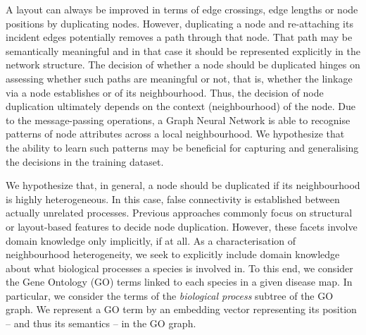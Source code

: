 \documentclass[
	fontsize=10pt, %
	twoside=true, %
	secnumdepth=1, %
  toc=indentunnumbered %
]{kaobook}
\begin{document}
A layout can always be improved in terms of edge crossings, edge lengths or node
positions by duplicating nodes. However, duplicating a node and re-attaching its
incident edges potentially removes a path through that node. That path
may be semantically meaningful and in that case it should be represented
explicitly in the network structure.
The decision of whether a node should be duplicated hinges on
assessing whether such paths are meaningful or not, that is, whether the linkage via
a node establishes  or  of its neighbourhood.
Thus, the decision of node duplication ultimately depends on the context
(neighbourhood) of the node.
%
Due to the message-passing operations, a Graph Neural
Network is able to recognise patterns of node attributes across a local
neighbourhood. We hypothesize that the ability to learn such patterns may be
beneficial for capturing and generalising the decisions in the training dataset.



We hypothesize that, in general, a node should be duplicated if its
neighbourhood is highly heterogeneous. In this case, false connectivity is
established between actually unrelated processes.
Previous approaches commonly focus on structural or layout-based features to
decide node duplication.
However, these facets involve domain knowledge only implicitly, if at all.
As a characterisation of neighbourhood heterogeneity, we seek
to explicitly include domain knowledge about what biological processes a species
is involved in. To this end, we consider the Gene Ontology (GO) terms linked to each
species in a given disease map. In particular, we consider the terms of the
\textit{biological process} subtree of the GO graph.
%
We represent a GO term by an embedding vector representing its position -- and
thus its semantics -- in the GO graph.
\end{document}
